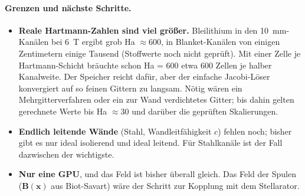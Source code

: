 \paragraph{Grenzen und nächste Schritte.}
\begin{itemize}\itemsep1pt
\item \textbf{Reale Hartmann-Zahlen sind viel größer.} Bleilithium in den \SI{10}{mm}-Kanälen bei \SI{6}{T} ergibt
  grob Ha $\approx 600$, in Blanket-Kanälen von einigen Zentimetern einige Tausend (Stoffwerte noch nicht geprüft).
  Mit einer Zelle je Hartmann-Schicht bräuchte schon Ha = 600 etwa 600 Zellen je halber Kanalweite. Der
  Speicher reicht dafür, aber der einfache Jacobi-Löser konvergiert auf so feinen Gittern zu langsam. Nötig wären ein
  Mehrgitterverfahren oder ein zur Wand verdichtetes Gitter; bis dahin gelten gerechnete Werte bis Ha $\approx 30$
  und darüber die geprüften Skalierungen.
\item \textbf{Endlich leitende Wände} (Stahl, Wandleitfähigkeit $c$) fehlen noch; bisher gibt es nur ideal isolierend
  und ideal leitend. Für Stahlkanäle ist der Fall dazwischen der wichtigste.
\item \textbf{Nur eine GPU}, und das Feld ist bisher überall gleich. Das Feld der Spulen ($\mathbf{B}(\mathbf{x})$
  aus Biot-Savart) wäre der Schritt zur Kopplung mit dem Stellarator.
\end{itemize}

